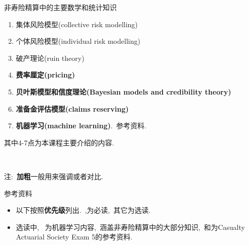 \documentclass[professionalfont]{beamer}
\newcommand{\green}[1]{\textbf{#1}}
\begin{document}
\begin{frame}{非寿险精算中的主要数学和统计知识}
	\begin{enumerate}
		\item 集体风险模型(collective risk modelling)			
		\item 个体风险模型(individual risk modelling)
		\item 破产理论(ruin theory)	
		\item \green{费率厘定(pricing)}
		\item \green{贝叶斯模型和信度理论(Bayesian models and credibility theory)}
		\item \green{准备金评估模型(claims reserving)}
		\item \green{机器学习(machine learning)}.~参考资料\cite{WB}.
	\end{enumerate}
	其中4-7点为本课程主要介绍的内容.
	
	~
	
	注:~\green{加粗}一般用来强调或者对比.
\end{frame}

\begin{frame}{参考资料}

\begin{itemize}
	\item 以下按照\green{优先级}列出.~\cite{no1},\cite{Meng}为必读,~其它为选读.
	\item 选读中, ~\cite{WB}为机器学习内容,~\cite{WB2}涵盖非寿险精算中的大部分知识,~\cite{Friedland}和\cite{Werner}为Casualty Actuarial Society Exam 5的参考资料.
\end{itemize}
\end{frame}
\end{document}
